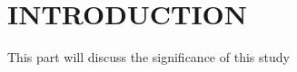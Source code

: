 
\chapter{INTRODUCTION} %
\label{chap:introduction}
This part will discuss the significance of this study


